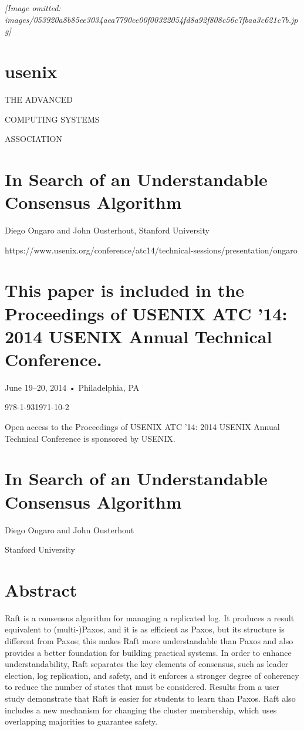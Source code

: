 \documentclass[
]{article}
\author{}
\date{}
\begin{document}
\textit{[Image omitted: images/053920a8b85ee3034aea7790ce00f00322054fd8a92f808c56c7fbaa3c621c7b.jpg]}

\section{usenix}\label{usenix}

THE ADVANCED

COMPUTING SYSTEMS

ASSOCIATION

\section{In Search of an Understandable Consensus
Algorithm}\label{in-search-of-an-understandable-consensus-algorithm}

Diego Ongaro and John Ousterhout, Stanford University

https://www.usenix.org/conference/atc14/technical-sessions/presentation/ongaro

\section{This paper is included in the Proceedings of USENIX ATC '14:
2014 USENIX Annual Technical
Conference.}\label{this-paper-is-included-in-the-proceedings-of-usenix-atc-14-2014-usenix-annual-technical-conference.}

June 19--20, 2014 • Philadelphia, PA

978-1-931971-10-2

Open access to the Proceedings of USENIX ATC '14: 2014 USENIX Annual
Technical Conference is sponsored by USENIX.

\section{In Search of an Understandable Consensus
Algorithm}\label{in-search-of-an-understandable-consensus-algorithm-1}

Diego Ongaro and John Ousterhout

Stanford University

\section{Abstract}\label{abstract}

Raft is a consensus algorithm for managing a replicated log. It produces
a result equivalent to (multi-)Paxos, and it is as efficient as Paxos,
but its structure is different from Paxos; this makes Raft more
understandable than Paxos and also provides a better foundation for
building practical systems. In order to enhance understandability, Raft
separates the key elements of consensus, such as leader election, log
replication, and safety, and it enforces a stronger degree of coherency
to reduce the number of states that must be considered. Results from a
user study demonstrate that Raft is easier for students to learn than
Paxos. Raft also includes a new mechanism for changing the cluster
membership, which uses overlapping majorities to guarantee safety.
\end{document}
